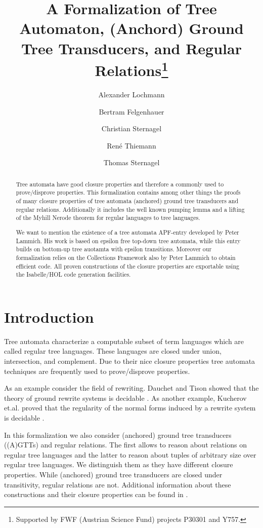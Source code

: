\documentclass[11pt,a4paper]{article}
\begin{document}
\title{A Formalization of Tree Automaton, (Anchord) Ground Tree Transducers, and Regular Relations\footnote{Supported by FWF (Austrian Science Fund) projects P30301 and Y757.}}
\author{Alexander Lochmann \and Bertram Felgenhauer \and Christian Sternagel \and Ren\'e Thiemann \and Thomas Sternagel}
\maketitle

\begin{abstract}
Tree automata have good closure properties and therefore a commonly
used to prove/disprove properties. This formalization contains
among other things the proofs of many closure properties of tree automata
(anchored) ground tree transducers and regular relations.
Additionally it includes the well known pumping lemma and a lifting of
the Myhill Nerode theorem for regular languages to tree languages.

We want to mention the existence of a tree automata APF-entry developed by
Peter Lammich. His work is based on epsilon free top-down tree automata,
while this entry builds on bottom-up tree auotamta with epsilon transitions.
Moreover our formalization relies on the Collections Framework also by Peter
Lammich \cite{Collections-AFP} to obtain efficient code.
All proven constructions of the closure properties are exportable using
the Isabelle/HOL code generation facilities.
\end{abstract}

\tableofcontents

\section{Introduction}

Tree automata characterize a computable subset of term languages
which are called regular tree languages. These languages are closed
under union, intersection, and complement. Due to their nice closure
properties tree automata techniques are frequently used to prove/disprove
properties.

As an example consider the field of rewriting.
Dauchet and Tison showed that the theory of ground rewrite systems is decidable \cite{DT90}.
As another example, Kucherov et.al. proved that the regularity of the normal forms
induced by a rewrite system is decidable \cite{KGTM}.

In this formalization we also consider (anchored) ground tree transducers ((A)GTTs)
and regular relations. The first allows to reason about relations on
regular tree languages and the latter to reason about tuples of arbitrary size
over regular tree languages. We distinguish them as they have different
closure properties. While (anchored) ground tree transducers are closed
under transitivity, regular relations are not. Additional information about
these constructions and their closure properties can be found in \cite{LMMF21}.
\end{document}
